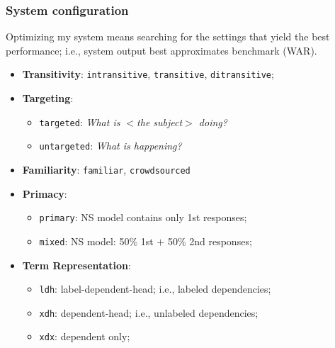 \documentclass[handout,xcolor={dvipsnames}]{beamer}
\newcommand{\param}[1]{\texttt{#1}}
\begin{document}
\begin{frame}
\frametitle{System configuration}
\small

Optimizing my system means searching for the settings that yield the best performance;
i.e., system output best approximates benchmark (WAR). \\

\begin{itemize}
\pause
\item \textbf{Transitivity}: \param{intransitive}, \param{transitive}, \param{ditransitive};
\pause
\item \textbf{Targeting}: 
\begin{itemize}
\item \param{targeted}: \textit{What is $<$the subject$>$ doing?}
\item \param{untargeted}: \textit{What is happening?}
\end{itemize}
\pause
\item \textbf{Familiarity}: \param{familiar}, \param{crowdsourced}
\pause
\item \textbf{Primacy}:
\begin{itemize}
\item \param{primary}: NS model contains only 1st responses;
\item \param{mixed}: NS model: 50\% 1st $+$ 50\% 2nd responses;
\end{itemize}
\pause
\item \textbf{Term Representation}:
\begin{itemize}
\item \param{ldh}: label-dependent-head; i.e., labeled dependencies;
\item \param{xdh}: dependent-head; i.e., unlabeled dependencies;
\item \param{xdx}: dependent only;
\end{itemize}
\end{itemize}
\end{frame}
\end{document}
